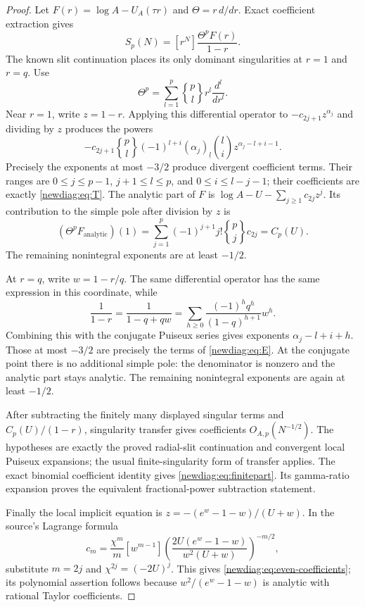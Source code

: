 \documentclass[11pt,a4paper]{article}
\numberwithin{equation}{section}
\theoremstyle{definition}
\theoremstyle{remark}
\begin{document}
\begin{proof}
Let $F(r)=\log A-U_A(\tau r)$ and
$\Theta=r\,d/dr$.  Exact coefficient extraction gives
\begin{equation}\label{newdiag:eq:partialsumgf}
 S_p(N)=[r^N]\frac{\Theta^pF(r)}{1-r}.
\end{equation}
The known slit continuation places its only dominant singularities
at $r=1$ and $r=q$.  Use
\[
 \Theta^p=\sum_{l=1}^p\genfrac{\{}{\}}{0pt}{}{p}{l}
                      r^l\frac{d^l}{dr^l}.
\]
Near $r=1$, write $z=1-r$.  Applying this differential operator to
$-c_{2j+1}z^{\alpha_j}$ and dividing by $z$ produces the powers
\[
 -c_{2j+1}\genfrac{\{}{\}}{0pt}{}{p}{l}
 (-1)^{l+i}(\alpha_j)_{\underline l}\binom li
 z^{\alpha_j-l+i-1}.
\]
Precisely the exponents at most $-3/2$ produce divergent
coefficient terms.  Their ranges are $0\leq j\leq p-1$,
$j+1\leq l\leq p$, and $0\leq i\leq l-j-1$; their coefficients
are exactly \eqref{newdiag:eq:T}.  The analytic part of $F$ is
$\log A-U-\sum_{j\geq1}c_{2j}z^j$.  Its contribution to the
simple pole after division by $z$ is
\[
 (\Theta^p F_{\mathrm{analytic}})(1)
   =\sum_{j=1}^p(-1)^{j+1}j!
                  \genfrac{\{}{\}}{0pt}{}{p}{j}c_{2j}=C_p(U).
\]
The remaining nonintegral exponents are at least $-1/2$.

At $r=q$, write $w=1-r/q$.  The same differential operator has
the same expression in this coordinate, while
\[
 \frac1{1-r}=\frac1{1-q+qw}
   =\sum_{h\geq0}\frac{(-1)^hq^h}{(1-q)^{h+1}}w^h.
\]
Combining this with the conjugate Puiseux series gives exponents
$\alpha_j-l+i+h$.  Those at most $-3/2$ are precisely the terms
of \eqref{newdiag:eq:E}.  At the conjugate point there is no
additional simple pole: the denominator is nonzero and the
analytic part stays analytic.  The remaining nonintegral exponents
are again at least $-1/2$.

After subtracting the finitely many displayed singular terms and
$C_p(U)/(1-r)$, singularity transfer \cite{FlajoletOdlyzko} gives coefficients
$O_{A,p}(N^{-1/2})$.  The hypotheses are exactly the proved radial-slit
continuation and convergent local Puiseux expansions; the usual
finite-singularity form of transfer applies.  The exact binomial
coefficient identity gives \eqref{newdiag:eq:finitepart}.  Its
gamma-ratio expansion proves the equivalent fractional-power
subtraction statement.

Finally the local implicit equation is
$z=-(e^w-1-w)/(U+w)$.  In the source's Lagrange formula
\[
 c_m=\frac{\chi^m}{m}[w^{m-1}]
 \left(\frac{2U(e^w-1-w)}{w^2(U+w)}\right)^{-m/2},
\]
substitute $m=2j$ and $\chi^{2j}=(-2U)^j$.  This gives
\eqref{newdiag:eq:even-coefficients}; its polynomial assertion follows
because $w^2/(e^w-1-w)$ is analytic with rational Taylor coefficients.
\end{proof}
\end{document}
